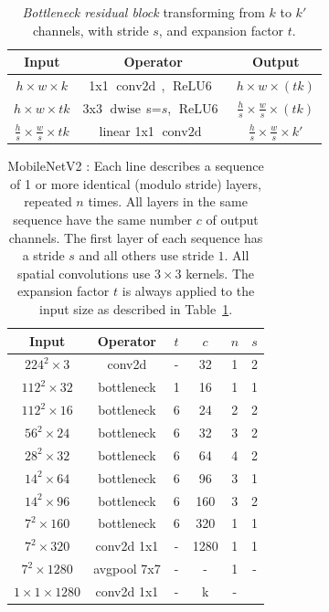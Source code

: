 \documentclass[10pt,twocolumn,letterpaper]{article}
\def\relus{{\ensuremath{\operatorname{\mathop{ReLU6}\,}}}}
\def\conv{{\ensuremath{\operatorname{\mathop{conv2d}\,}}}}
\def\depthwise{{\ensuremath{\operatorname{\mathop{dwise}\,}}}}
\begin{document}
\begin{table}
\centering
    \begin{tabular}{c|c|c}
    Input & Operator & Output\\
    \toprule [0.2em]
    $h \times w \times k$ & 1x1 \conv, \relus & $h \times w \times (tk)$\\
    $h \times w \times tk$& 3x3 \depthwise s=$s$, \relus & $\frac{h}{s} \times \frac{w}{s} \times (tk)$\\ 
    $\frac{h}{s} \times \frac{w}{s} \times tk$ & linear 1x1 \conv & $\frac{h}{s} \times \frac{w}{s} \times k'$\\
    \toprule[0.2em]
    \end{tabular}

    \caption{{\em Bottleneck residual block} transforming from $k$ to $k'$ channels, with stride $s$, and expansion factor $t$.}

\label{fig:bottlenec_block_table}
\end{table}

\begin{table}[t]
%
\centering
\vspace{0pt}
\begin{tabular}{c|c|c|c|c|c}
\toprule[0.2em]
Input & Operator                           & $t$& $c$ & $n$ & $s$ \\
\toprule[0.2em]
$224^2\times3$ &    conv2d                  &  - &  32 & 1 & 2\\
$112^2\times32$ &    bottleneck    &  1 & 16   & 1 & 1 \\
$112^2\times16$ &   bottleneck     &  6 & 24   & 2 & 2 \\
$56^2\times24$ &   bottleneck      &  6 & 32   & 3 & 2 \\
$28^2\times32$ & bottleneck        &  6 & 64   & 4 & 2 \\
$14^2\times64$ &    bottleneck     &  6 & 96   & 3 & 1 \\
$14^2\times96$ &    bottleneck     &  6 & 160  & 3 & 2 \\
$7^2\times160$ &    bottleneck     &  6 & 320  & 1 & 1 \\
$7^2\times 320$ & conv2d 1x1       &  - & 1280 & 1 & 1 \\
$7^2\times1280$  & avgpool 7x7     &  - & -    & 1 & - \\   
$1\times1\times 1280$ & conv2d 1x1                      &  - & k    & -& \\
\toprule[0.2em]
\end{tabular}
%
%

\caption {
    \mbox{MobileNetV2} : Each line describes a sequence of 1 or more identical (modulo stride)  layers, repeated $n$ times.
    All layers in the same sequence have the same number $c$ of output channels.
    The first layer of each sequence has a stride $s$ and all others use stride $1$.
    All spatial convolutions use $3\times 3$ kernels. The expansion factor $t$ is always applied to the input size as described in Table~\ref{fig:bottlenec_block_table}.
}
\label{mobilenet:arch}
\end{table}
\end{document}
